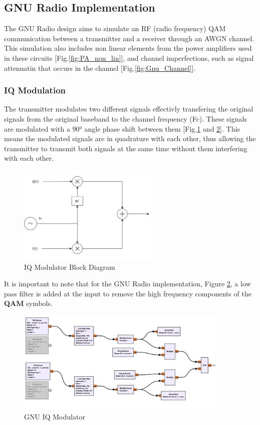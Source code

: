 \subsection{GNU Radio Implementation}

The GNU Radio design aims to simulate an RF (radio frequency) QAM communication 
between a transmitter and a receiver through an AWGN channel.
This simulation also includes non linear elements from the power amplifiers used 
in these circuits [Fig.\ref{fig:PA_non_lin}], and channel imperfections, such 
as signal attenuatin that occurs in the channel [Fig.\ref{fig:Gnu_Channel}].

\subsubsection{IQ Modulation}

The transmitter modulates two different signals effectivly transfering the original signals 
from the original baseband to the channel frequency (Fc). These signals are modulated 
with a \ang{90} angle phase shift between them [Fig.\ref{fig:IQMod_Diagram} and \ref{fig:GNU_IQMod}].
This means the modulated signals are in quadrature with each other, thus allowing the 
transmitter to transmit both signals at the same time without them interfering with each 
other. 


\begin{figure}[H]
    \centering
    \includegraphics*[width=0.6\textwidth]{Images/IQ_Mod_Diagram.png}
    \caption{IQ Modulator Block Diagram}
    \label{fig:IQMod_Diagram}
\end{figure}

It is important to note that for the GNU Radio implementation, Figure \ref{fig:GNU_IQMod}, a low pass filter is added at the input to remove the high frequency components of the \textbf{QAM} symbols.

\begin{figure}[H]
    \centering
    \includegraphics*[width=0.9\textwidth]{Images/GNU_Digital_IQMod.png}
    \caption{GNU IQ Modulator}
    \label{fig:GNU_IQMod}
\end{figure}

